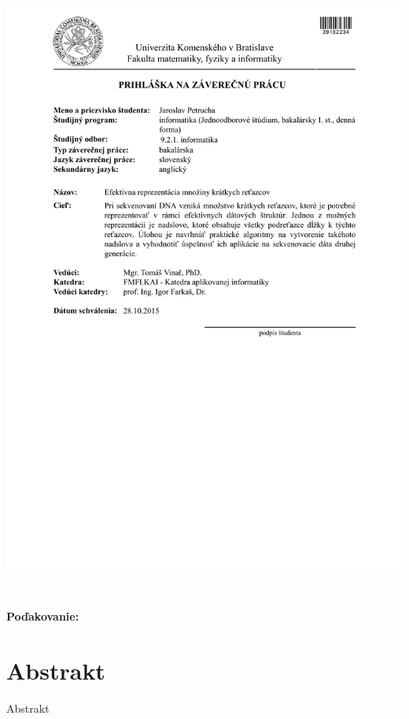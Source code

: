 \documentclass[12pt, oneside]{book}
\begin{document}
\newpage 
\thispagestyle{empty}
\hspace{-2cm}\includegraphics[width=1.1\textwidth]{images/zadanie}


\frontmatter

\setcounter{page}{3}
\newpage 
~

\vfill
{\bf Poďakovanie:}


\newpage 
\section*{Abstrakt}

Abstrakt
\end{document}

